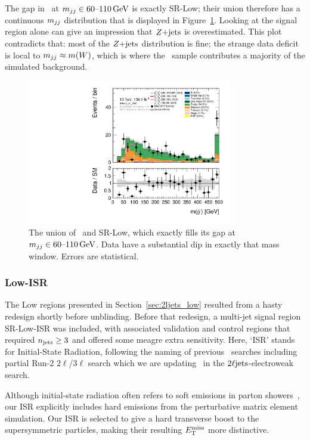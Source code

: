 The gap in \crz\ at $\mjj \in 60\textrm{--}110\,\eV[G]$ is exactly SR-Low;
their union therefore has a continuous $\mjj$ distribution that is displayed
in Figure~\ref{fig:2ljets_low_sr_or_cr_region}.
Looking at the signal region alone can give an impression that $\zjets$ is
overestimated.
This plot contradicts that: most of the $\zjets$ distribution is fine;
the strange data deficit is local to $\mjj \approx m(W)$, which is where the
\diboson\ sample contributes a majority of the simulated background.

\begin{figure}[tp]
\centering
\includegraphics[width=0.8\textwidth]{figures/2ljets_low_mjj_SRLow_or_CRZ.pdf}
\caption[
The union of CR-Z and SR-Low
]{%
The union of \crz\ and SR-Low, which exactly fills its gap at
$\mjj \in 60\textrm{--}110\,\eV[G]$.
Data have a substantial dip in exactly that mass window.
Errors are statistical.
}
\label{fig:2ljets_low_sr_or_cr_region}
\end{figure}


\subsubsection{Low-ISR}
\label{sec:2ljets_low_isr}
The Low regions presented in Section~\ref{sec:2ljets_low} resulted from a
hasty redesign shortly before unblinding.
Before that redesign, a multi-jet signal region SR-Low-ISR was included,
with associated validation and control regions
that required $\njet \geq 3$ and offered some meagre extra sensitivity.
Here, `ISR' stands for Initial-State Radiation, following the naming
of previous \atlas\ searches including partial Run-2 $2\ell$/$3\ell$
search which we are updating~\cite{atlas_23l_SUSY_2016_24} in the
$\twoljets$-electroweak search.

Although initial-state radiation often refers to soft emissions in
parton showers~\cite{corcella2000initial, bewick2022initial},
our ISR explicitly includes hard emissions from the perturbative matrix element
simulation.
Our ISR is selected to give a hard transverse boost to the supersymmetric
particles, making their resulting $\met$ more distinctive.

